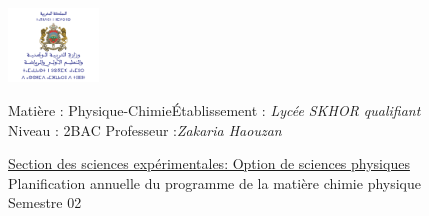 \documentclass[12pt]{article}
\newcommand\headerMe[2]{\noindent{}#1\hfill#2}
\begin{document}
\begin{center}
\includegraphics[width = 0.18\textwidth]{./img/logoMin.png}
\vspace{-3cm}
\end{center}
\headerMe{Matière : Physique-Chimie}{Établissement : \emph{Lycée SKHOR qualifiant}}\\
\headerMe{ Niveau : 2BAC }{  Professeur :\emph{Zakaria Haouzan}}\\

\begin{center}
	\vspace{0.5cm}
\underline{Section des sciences expérimentales: Option de sciences physiques}\\
\hrulefill
\Large{Planification annuelle
du programme de la matière chimie physique}
\hrulefill\\
\Large{Semestre 02}
\hrulefill\\

\end{center}
\end{document}
